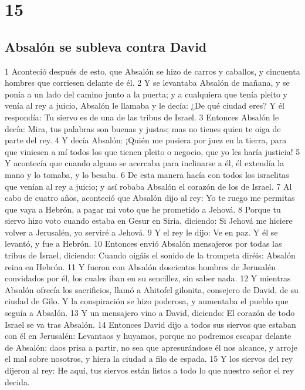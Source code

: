 \chapter{15}

\section*{Absalón se subleva contra David}


1 Aconteció después de esto, que Absalón se hizo de carros y caballos, y cincuenta hombres que corriesen delante de él.
2 Y se levantaba Absalón de mañana, y se ponía a un lado del camino junto a la puerta; y a cualquiera que tenía pleito y venía al rey a juicio, Absalón le llamaba y le decía: ¿De qué ciudad eres? Y él respondía: Tu siervo es de una de las tribus de Israel.
3 Entonces Absalón le decía: Mira, tus palabras son buenas y justas; mas no tienes quien te oiga de parte del rey.
4 Y decía Absalón: ¡Quién me pusiera por juez en la tierra, para que viniesen a mí todos los que tienen pleito o negocio, que yo les haría justicia! 
5 Y acontecía que cuando alguno se acercaba para inclinarse a él, él extendía la mano y lo tomaba, y lo besaba.
6 De esta manera hacía con todos los israelitas que venían al rey a juicio; y así robaba Absalón el corazón de los de Israel.
7 Al cabo de cuatro años, aconteció que Absalón dijo al rey: Yo te ruego me permitas que vaya a Hebrón, a pagar mi voto que he prometido a Jehová.
8 Porque tu siervo hizo voto cuando estaba en Gesur en Siria, diciendo: Si Jehová me hiciere volver a Jerusalén, yo serviré a Jehová.
9 Y el rey le dijo: Ve en paz. Y él se levantó, y fue a Hebrón.
10 Entonces envió Absalón mensajeros por todas las tribus de Israel, diciendo: Cuando oigáis el sonido de la trompeta diréis: Absalón reina en Hebrón.
11 Y fueron con Absalón doscientos hombres de Jerusalén convidados por él, los cuales iban en su sencillez, sin saber nada.
12 Y mientras Absalón ofrecía los sacrificios, llamó a Ahitofel gilonita, consejero de David, de su ciudad de Gilo. Y la conspiración se hizo poderosa, y aumentaba el pueblo que seguía a Absalón.
13 Y un mensajero vino a David, diciendo: El corazón de todo Israel se va tras Absalón.
14 Entonces David dijo a todos sus siervos que estaban con él en Jerusalén: Levantaos y huyamos, porque no podremos escapar delante de Absalón; daos prisa a partir, no sea que apresurándose él nos alcance, y arroje el mal sobre nosotros, y hiera la ciudad a filo de espada.
15 Y los siervos del rey dijeron al rey: He aquí, tus siervos están listos a todo lo que nuestro señor el rey decida.
